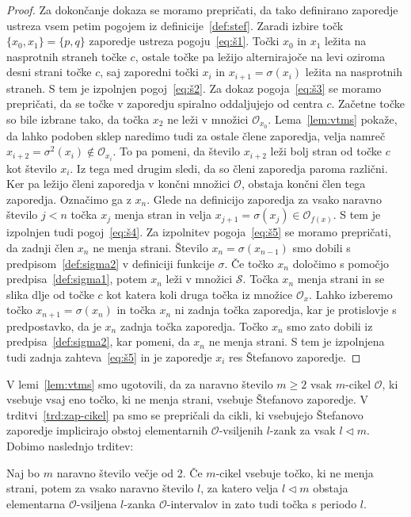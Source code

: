 \documentclass[mat2]{fmfdelo}
\begin{document}
\begin{proof}
Za dokončanje dokaza se moramo prepričati, da tako definirano zaporedje ustreza vsem petim pogojem iz definicije~\ref{def:stef}.
Zaradi izbire točk $\{x_0, x_1\} = \{p, q\}$ zaporedje ustreza pogoju~\ref{eq:š1}.
Točki $x_0$ in $x_1$ ležita na nasprotnih straneh točke $c$, ostale točke pa ležijo alternirajoče na levi oziroma desni strani točke $c$, saj zaporedni točki $x_i$ in $x_{i+1}=\sigma(x_i)$ ležita na nasprotnih straneh. S tem je izpolnjen pogoj~\ref{eq:š2}.
Za dokaz pogoja~\ref{eq:š3} se moramo prepričati, da se točke v zaporedju spiralno oddaljujejo od centra $c$. Začetne točke so bile izbrane tako, da točka $x_2$ ne leži v množici $\mathcal{O}_{x_0}$. Lema~\ref{lem:vtms} pokaže, da lahko podoben sklep naredimo tudi za ostale člene zaporedja, velja namreč $x_{i+2} = \sigma^2(x_i) \notin \mathcal{O}_{x_i}$. To pa pomeni, da število $x_{i+2}$ leži bolj stran od točke $c$ kot število $x_i$. Iz tega med drugim sledi, da so členi zaporedja paroma različni. Ker pa ležijo členi zaporedja v končni množici $\mathcal{O}$, obstaja končni člen tega zaporedja. Označimo ga z $x_n$.
Glede na definicijo zaporedja za vsako naravno število $j<n$ točka $x_j$ menja stran in velja $x_{j+1} = \sigma(x_j) \in \mathcal{O}_{f(x)}$. S tem je izpolnjen tudi pogoj~\ref{eq:š4}.
Za izpolnitev pogoja~\ref{eq:š5} se moramo prepričati, da zadnji člen $x_n$ ne menja strani. Število $x_n=\sigma(x_{n-1})$ smo dobili s predpisom~\ref{def:sigma2} v definiciji funkcije $\sigma$. Če točko $x_n$ določimo s pomočjo predpisa~\ref{def:sigma1}, potem $x_n$ leži v množici $\mathcal{S}$. Točka $x_n$ menja strani in se slika dlje od točke $c$ kot katera koli druga točka iz množice $\mathcal{O}_x$. Lahko izberemo točko $x_{n+1} = \sigma(x_n)$ in točka $x_n$ ni zadnja točka zaporedja, kar je protislovje s predpostavko, da je $x_n$ zadnja točka zaporedja. Točko $x_n$ smo zato dobili iz predpisa~\ref{def:sigma2}, kar pomeni, da $x_n$ ne menja strani. S tem je izpolnjena tudi zadnja zahteva~\ref{eq:š5} in je zaporedje $x_i$ res Štefanovo zaporedje. 
\end{proof}
V lemi~\ref{lem:vtms} smo ugotovili, da za naravno število $m \geq 2$ vsak $m$-cikel $\mathcal{O}$, ki vsebuje vsaj eno točko, ki ne menja strani, vsebuje Štefanovo zaporedje. V trditvi~\ref{trd:zap-cikel} pa smo se prepričali da cikli, ki vsebujejo Štefanovo zaporedje implicirajo obstoj elementarnih $\mathcal{O}$-vsiljenih $l$-zank za vsak $l\triangleleft m$. Dobimo naslednjo trditev: 

\begin{trditev}\label{trd:tnmsoc}
Naj bo $m$ naravno število večje od 2. Če $m$-cikel vsebuje točko, ki ne menja strani, potem za vsako naravno število $l$, za katero velja $l \triangleleft m$ obstaja elementarna $\mathcal{O}$-vsiljena $l$-zanka $\mathcal{O}$-intervalov in zato tudi točka s periodo $l$.
\end{trditev}
\end{document}
